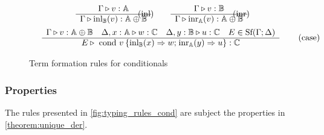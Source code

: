 \begin{figure} [H]
\begin{equation*}
\begin{split}
\begin{aligned}
& \hspace{55pt}
\begin{minipage}[t]{0.3\textwidth}
$\begin{array}{c}
     \Gamma \triangleright v: \mathbb{A} \\
    \hline
   \Gamma \triangleright \text{inl}_{\mathbb{B}}(v):  \mathbb{A} \oplus \mathbb{B}
\end{array}
$
\end{minipage}
\hspace{-30pt}
\text{(inl)} 
 \hspace{20pt}
\begin{minipage}[t]{0.3\textwidth}
$\begin{array}{c}
      \Gamma \triangleright v:  \mathbb{B} \\
    \hline
   \Gamma \triangleright \text{inr}_{\mathbb{A}}(v): \mathbb{A} \oplus \mathbb{B}
\end{array}
$ \end{minipage} 
\hspace{-30pt} \text{(inr)} \\
&\hspace{15pt}
\begin{minipage}[t]{0.3\textwidth}
$\begin{array}{c}
     \Gamma\triangleright v: \mathbb{A} \oplus \mathbb{B} \quad \Delta, x: \mathbb{A} \triangleright w: \mathbb{C} \quad \Delta, y: \mathbb{B}  \triangleright u : \mathbb{C}   \quad E \in \text{Sf}(\Gamma;\Delta)  \\
    \hline
   E \triangleright \text{ cond } v \hspace{2pt} \{\text{inl}_{\mathbb{B}} (x) \Rightarrow w ; \hspace{1pt} \text{inr}_{\mathbb{A}} (y) \Rightarrow u\}: \mathbb{C} 
\end{array}
$
\end{minipage}
\hspace{200pt}
\text{(case)} 
\end{aligned}
\end{split}
\end{equation*}
\caption{Term formation rules for conditionals}
\label{fig:typing_rules_cond}
\end{figure}


\subsubsection{Properties}
The rules presented in \autoref{fig:typing_rules_cond} are subject 
the properties in \autoref{theorem:unique_der}.


